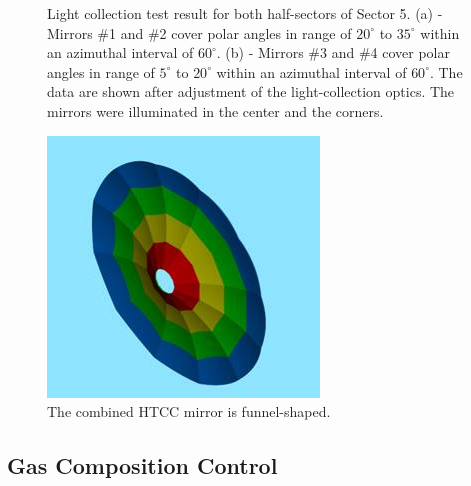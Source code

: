 \begin{figure}
\begin{subfigure}[b]{0.5\textwidth}
    \caption{} \label{fig:subfig1_b}
\end{subfigure}
\caption{Light collection test result for both half-sectors of Sector 5. (a) - Mirrors \#1 and \#2 cover polar
  angles in range of $20^\circ$ to $35^\circ$  within an azimuthal interval of $60^\circ$. (b) - Mirrors \#3 and
  \#4 cover polar angles in range of $5^\circ$ to $20^\circ$  within an azimuthal interval of $60^\circ$. The data
  are shown after adjustment of the light-collection optics. The mirrors were illuminated in the center and the
  corners.} 
\label{fig:subfig}
\end{figure}

\begin{figure}[ht]
    \centering
    \includegraphics[width=1.0\linewidth,trim={0 0cm 0 0},clip]{images/Colored_Mirror.jpg}
    \caption{The combined HTCC mirror is funnel-shaped.}
    \label{fig:Colored_Mirror}
\end{figure}

\subsection{Gas Composition Control}

